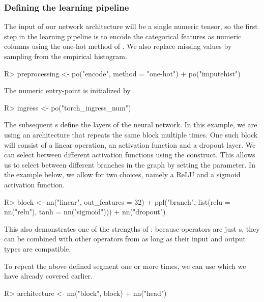 \documentclass[article]{jss}
\theoremstyle{definition}
\begin{document}
\subsubsection{Defining the learning pipeline}
The input of our network architecture will be a single numeric tensor, so the first step in the learning pipeline is to encode the categorical features as numeric columns using the one-hot method of .
We also replace missing values by sampling from the empirical histogram.

\begin{CodeInput}
R> preprocessing <- po("encode", method = "one-hot") %
+    po("imputehist")
\end{CodeInput}

The numeric entry-point is initialized by .

\begin{CodeInput}
R> ingress <- po("torch_ingress_num")
\end{CodeInput}

The subsequent s define the layers of the neural network.
In this example, we are using an architecture that repeats the same block multiple times.
One such block will consist of a linear operation, an activation function and a dropout layer.
We can select between different activation functions using the  construct.
This allows us to select between different branches in the graph by setting the  parameter.
In the example below, we allow for two choices, namely a ReLU and a sigmoid activation function.

\begin{CodeInput}
R> block <- nn("linear", out_features = 32) %
+    ppl("branch", list(relu = nn("relu"), tanh = nn("sigmoid"))) %
+    nn("dropout")
\end{CodeInput}

This also demonstrates one of the strengths of : because  operators are just s, they can be combined with other operators from  as long as their input and output types are compatible.

To repeat the above defined segment one or more times, we can use  which we have already covered earlier.

\begin{CodeInput}
R> architecture <- nn("block", block) %
+    nn("head")
\end{CodeInput}
\end{document}
